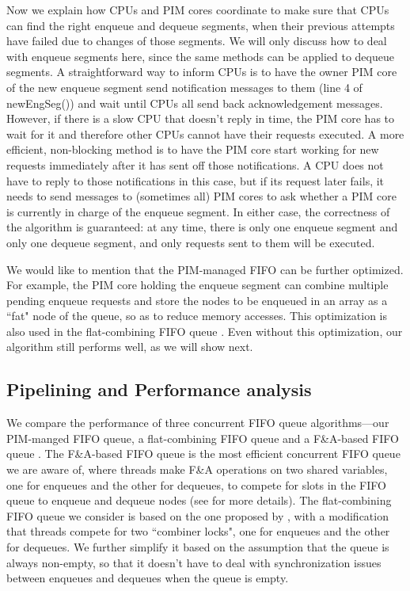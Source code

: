 Now we explain how CPUs and PIM cores coordinate to make sure that CPUs can find the right enqueue 
and dequeue segments, when their previous attempts have failed due to changes of those segments. 
We will only discuss how to deal with enqueue segments here, 
since the same methods can be applied to dequeue segments. 
A straightforward way to inform CPUs is to have the owner PIM core of the new enqueue segment 
send notification messages to them (line 4 of newEngSeg()) 
and wait until CPUs all send back acknowledgement messages. 
However, if there is a slow CPU that doesn't reply in time, 
the PIM core has to wait for it and therefore other CPUs cannot have their requests executed. 
A more efficient, non-blocking method is to have the PIM core start working for new requests 
immediately after it has sent off those notifications. 
A CPU does not have to reply to those notifications in this case, 
but if its request later fails, it needs to send messages to (sometimes all) PIM cores 
to ask whether a PIM core is currently in charge of the enqueue segment.
In either case, the correctness of the algorithm is guaranteed:  
at any time, there is only one enqueue segment and only one dequeue segment, 
and only requests sent to them will be executed. 
  
We would like to mention that the PIM-managed FIFO can be further optimized. 
For example, the PIM core holding the enqueue segment can combine multiple pending enqueue requests 
and store the nodes to be enqueued in an array as a ``fat" node of the queue, 
so as to reduce memory accesses. 
This optimization is also used in the flat-combining FIFO queue \cite{Hendler10}. 
Even without this optimization, our algorithm still performs well, as we will show next. 

\subsection{Pipelining and Performance analysis}
We compare the performance of three concurrent FIFO queue algorithms---our PIM-manged FIFO queue, 
a flat-combining FIFO queue and a F\&A-based FIFO queue \cite{Morrison13}. 
The F\&A-based FIFO queue is the most efficient concurrent FIFO queue we are aware of, 
where threads make F\&A operations on two shared variables, 
one for enqueues and the other for dequeues, to compete for slots in the FIFO queue to 
enqueue and dequeue nodes (see \cite{Morrison13} for more details). 
The flat-combining FIFO queue we consider is based on the one proposed by \cite{Hendler10}, 
with a modification that threads compete for two ``combiner locks", 
one for enqueues and the other for dequeues. 
We further simplify it based on the assumption that the queue is always non-empty, 
so that it doesn't have to deal with synchronization issues between enqueues and dequeues 
when the queue is empty. 

